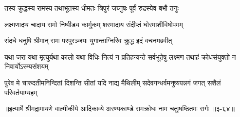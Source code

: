 \twolineshloka
{तस्य क्रुद्धस्य रामस्य तथाभूतस्य धीमतः}
{त्रिपुरं जघ्नुषः पूर्वं रुद्रस्येव बभौ तनुः} %

\twolineshloka
{लक्ष्मणादथ चादाय रामो निष्पीड्य कार्मुकम्}
{शरमादाय संदीप्तं घोरमाशीविषोपमम्} %

\twolineshloka
{संदधे धनुषि श्रीमान् रामः परपुरञ्जयः}
{युगान्ताग्निरिव क्रुद्ध इदं वचनमब्रवीत्} %

\threelineshloka
{यथा जरा यथा मृत्युर्यथा कालो यथा विधिः}
{नित्यं न प्रतिहन्यन्ते सर्वभूतेषु लक्ष्मण}
{तथाहं क्रोधसंयुक्तो न निवार्योऽस्म्यसंशयम्} %

\twolineshloka
{पुरेव मे चारुदतीमनिन्दितां दिशन्ति सीतां यदि नाद्य मैथिलीम्}
{सदेवगन्धर्वमनुष्यपन्नगं जगत् सशैलं परिवर्तयाम्यहम्} %


॥इत्यार्षे श्रीमद्रामायणे वाल्मीकीये आदिकाव्ये अरण्यकाण्डे रामक्रोधः नाम चतुःषष्ठितमः सर्गः ॥३-६४॥
